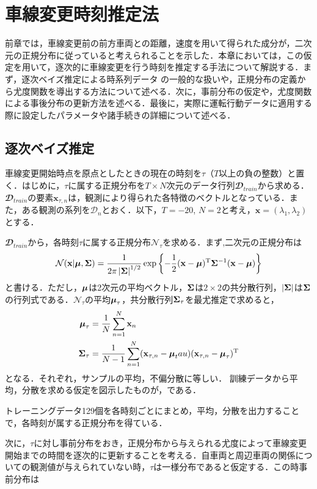 \chapter{車線変更時刻推定法}
前章では，車線変更前の前方車両との距離，速度を用いて得られた成分が，二次元の正規分布に従っていると考えられることを示した．本章においては，この仮定を用いて，逐次的に車線変更を行う時刻を推定する手法について解説する．まず，逐次ベイズ推定による時系列データ%
の一般的な扱いや，正規分布の定義から尤度関数を導出する方法について述べる．次に，事前分布の仮定や，尤度関数による事後分布の更新方法を述べる．最後に，実際に運転行動データに適用する際に設定したパラメータや諸手続きの詳細について述べる．
\section{逐次ベイズ推定}
車線変更開始時点を原点としたときの現在の時刻を$\tau$（$T$以上の負の整数）と置く．はじめに，$\tau$に属する正規分布を$T\times N$次元のデータ行列$\mathbfcal{D}_\mathit{train}$から求める．$\mathbfcal{D}_\mathit{train}$の要素$\mathbf{x}_{\tau,n}$は，観測により得られた各特徴のベクトルとなっている．また，ある観測の系列を$\mathcal{D}_n$とおく．以下，$T=-20$, $N=2$と考え，$\mathbf{x}=(\lambda_1, \lambda_2)$とする．
\par
$\mathbfcal{D}_\mathit{train}$から，各時刻$\tau$に属する正規分布$\mathcal{N}_\tau$を求める．まず,二次元の正規分布は
\begin{align}
	\mathcal{N}(\mathbf{x}|\boldsymbol{\mu},\mathbf{\Sigma})=\frac{1}{2\pi\left|\mathbf{\Sigma}\right|^{1/2}}\exp\left\{-\frac{1}{2}(\mathbf{x}-\boldsymbol{\mu})^\mathrm{T}\mathbf{\Sigma}^{-1}(\mathbf{x}-\boldsymbol{\mu})\right\}
\end{align}
と書ける．ただし，$\boldsymbol{\mu}$は2次元の平均ベクトル，$\mathbf{\Sigma}$は$2\times2$の共分散行列，$\left|\mathbf{\Sigma}\right|$は$\mathbf{\Sigma}$の行列式である．$\mathcal{N}_\tau$の平均$\boldsymbol{\mu}_\tau$，共分散行列$\mathbf{\Sigma}_\tau$を最尤推定で求めると，
\begin{align}
	\boldsymbol{\mu}_\tau&=\frac{1}{N}\sum_{n=1}^N \mathbf{x}_n\\
	\mathbf{\Sigma}_\tau&=\frac{1}{N-1}\sum_{n=1}^N (\mathbf{x}_{\tau,n}-\boldsymbol{\mu}_tau)(\mathbf{x}_{\tau,n}-\boldsymbol{\mu}_\tau)^\mathrm{T}
\end{align}
となる．それぞれ，サンプルの平均，不偏分散に等しい．
訓練データから平均，分散を求める仮定を図示したものが，である．

トレーニングデータ129個を各時刻ごとにまとめ，平均，分散を出力することで，各時刻が属する正規分布を得ている．
\par
次に，$\tau$に対し事前分布をおき，正規分布から与えられる尤度によって車線変更開始までの時間を逐次的に更新することを考える．自車両と周辺車両の関係についての観測値が与えられていない時，$\tau$は一様分布であると仮定する．この時事前分布は
